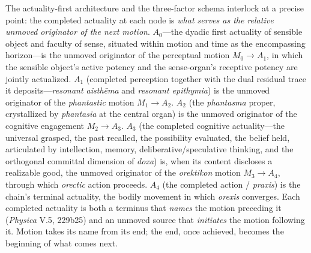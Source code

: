 The actuality-first architecture and the three-factor schema interlock at a precise point: the completed actuality at each node is \textit{what serves as the relative unmoved originator of the next motion}. $A_0$---the dyadic first actuality of sensible object and faculty of sense, situated within motion and time as the encompassing horizon---is the unmoved originator of the perceptual motion $M_0 \rightarrow A_1$, in which the sensible object's active potency and the sense-organ's receptive potency are jointly actualized. $A_1$ (completed perception together with the dual residual trace it deposits---\textit{resonant aisthēma} and \textit{resonant epithymia}) is the unmoved originator of the \textit{phantastic} motion $M_1 \rightarrow A_2$. $A_2$ (the \textit{phantasma} proper, crystallized by \textit{phantasia} at the central organ) is the unmoved originator of the cognitive engagement $M_2 \rightarrow A_3$. $A_3$ (the completed cognitive actuality---the universal grasped, the past recalled, the possibility evaluated, the belief held, articulated by intellection, memory, deliberative/speculative thinking, and the orthogonal committal dimension of \textit{doxa}) is, when its content discloses a realizable good, the unmoved originator of the \textit{orektikon} motion $M_3 \rightarrow A_4$, through which \textit{orectic} action proceeds. $A_4$ (the completed action / \textit{praxis}) is the chain's terminal actuality, the bodily movement in which \textit{orexis} converges. Each completed actuality is both a terminus that \textit{names} the motion preceding it (\textit{Physica} V.5, 229b25) and an unmoved source that \textit{initiates} the motion following it. Motion takes its name from its end; the end, once achieved, becomes the beginning of what comes next. 

